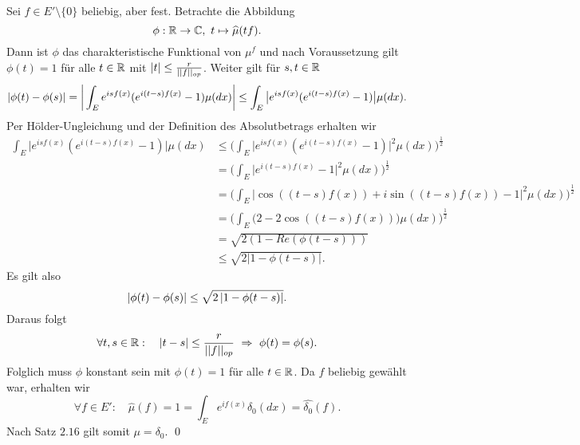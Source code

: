 \begin{proof*}
    Sei $f \in E'\setminus\{0\}$ beliebig, aber fest. Betrachte die Abbildung 
    $$
        \phi : \mathbb{R} \to \mathbb{C}, \ t \mapsto \widehat{\mu}(tf). 
    $$
    Dann ist $\phi$ das charakteristische Funktional von $\mu^{f}$ und nach Voraussetzung gilt $\phi(t) = 1$ für alle $t \in \mathbb{R}$ mit $\left| t \right| \leq \frac{r}{\lvert\lvert f \rvert\rvert_{op}}$. 
    Weiter gilt für $s,t \in \mathbb{R}$
    \begin{align*}
        \left| \phi(t) - \phi(s) \right| = \bigg\lvert\int_E e^{isf(x)}(e^{i(t-s)f(x)} - 1)\mu(dx)\bigg\rvert \leq \int_E\big\lvert e^{isf(x)}(e^{i(t-s)f(x)} - 1)\big\rvert\mu(dx).
    \end{align*}
    Per Hölder-Ungleichung und der Definition des Absolutbetrags erhalten wir 
    \begin{align*}
        \int_E\big\lvert e^{isf(x)}(e^{i(t-s)f(x)} - 1)\big\rvert\mu(dx) &\leq \bigg(\int_E\big\lvert e^{isf(x)}(e^{i(t-s)f(x)} - 1)\big\rvert^2\mu(dx)\bigg)^{\frac{1}{2}} \\\
                                                          &= \bigg( \int_E \big\lvert e^{i(t-s)f(x)}-1\big\rvert^2\mu(dx) \bigg)^{\frac{1}{2}} \\\
                                                          &= \bigg( \int_E \big\lvert \cos((t-s)f(x)) + i \sin((t-s)f(x)) -1 \big\rvert^2\mu(dx) \bigg)^{\frac{1}{2}} \\\
                                                          &= \bigg( \int_E \big( 2 - 2\cos((t-s)f(x)) \big)\mu(dx) \bigg)^{\frac{1}{2}} \\\
                                                          &= \sqrt{2(1- Re(\phi(t-s)))} \\\
                                                          &\leq \sqrt{2\lvert 1 - \phi(t-s)\rvert}. 
    \end{align*}                        
    Es gilt also
    $$
        \left| \phi(t) - \phi(s) \right| \leq \sqrt{2\left| 1-\phi(t-s) \right|}.
    $$
    Daraus folgt
    $$
        \forall t,s \in \mathbb{R}: \quad \left| t-s \right| \leq \frac{r}{\lvert\lvert f \rvert\rvert_{op}} \ \Rightarrow \ \phi(t) = \phi(s). 
    $$
    Folglich muss $\phi$ konstant sein mit $\phi(t) = 1$ für alle $t \in \mathbb{R}$. Da $f$ beliebig gewählt war, erhalten wir
    $$
        \forall f \in E': \quad \widehat{\mu}(f) = 1 = \int_E e^{if(x)}\delta_0(dx) = \widehat{\delta_0}(f). 
    $$
    Nach Satz $2.16$ gilt somit $\mu = \delta_0$. \qed
\end{proof*}

